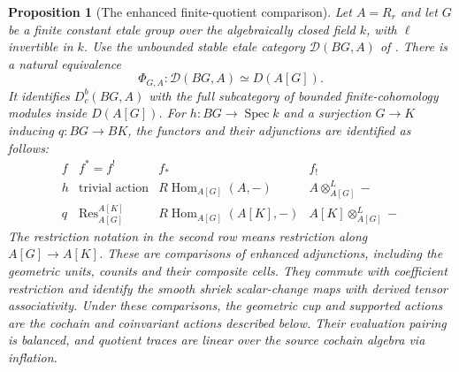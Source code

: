 \documentclass[11pt]{article}
\newtheorem{proposition}[theorem]{Proposition}
\theoremstyle{definition}
\theoremstyle{remark}
\begin{document}
\begin{proposition}[The enhanced finite-quotient comparison]
\label{prop:frag-finite-quotient-enhancement}
Let $A=R_r$ and let $G$ be a finite constant etale group over the
algebraically closed field $k$, with $\ell$ invertible in $k$.
Use the unbounded stable etale category $\mathcal D(BG,A)$ of
\cite[\S6.2]{LiuZhengEnhanced}.  There is a natural equivalence
\[
 \Phi_{G,A}:\mathcal D(BG,A)\simeq D(A[G]).
\]
It identifies $D_c^b(BG,A)$ with the full subcategory of bounded
finite-cohomology modules inside $D(A[G])$.  For $h:BG\to\operatorname{Spec}k$ and a surjection
$G\to K$ inducing $q:BG\to BK$, the functors and their adjunctions
are identified as follows:
\[
\begin{array}{c|c|c|c}
 f&f^*=f^!&f_*&f_!\\ \hline
 h&\text{trivial action}&R\operatorname{Hom}_{A[G]}(A,-)
                         &A\otimes^L_{A[G]}-\\
 q&\operatorname{Res}_{A[G]}^{A[K]}
   &R\operatorname{Hom}_{A[G]}(A[K],-)
   &A[K]\otimes^L_{A[G]}-
\end{array}
\]
The restriction notation in the second row means restriction along
$A[G]\to A[K]$.  These are comparisons of enhanced adjunctions,
including the geometric units, counits and their composite cells.
They commute with coefficient restriction and identify the smooth
shriek scalar-change maps with derived tensor associativity.
Under these comparisons, the geometric cup and supported actions
are the cochain and coinvariant actions described below.  Their
evaluation pairing is balanced, and quotient traces are linear over
the source cochain algebra via inflation.
\end{proposition}
\end{document}
